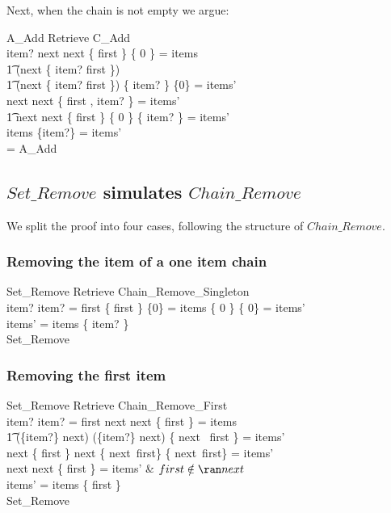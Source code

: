 \documentclass{article}
\begin{document}
Next, when the chain is not empty we argue:

\begin{argue}
	\pre A\_Add \land \Delta Retrieve \land C\_Add \\
\implies item?  \land \dom next \cup \ran next \cup \{ first \} \setminus \{ 0 \} = items \land {} \\
\t1 \dom (next \cup \{ item? \mapsto first \}) \cup {} \\
\t1 \ran (next \cup \{ item? \mapsto first \}) \cup \{ item? \} \setminus \{0\} = items' \\
\implies \dom next \cup \ran next \cup \{ first , item? \} = items' \\
\t1 \implies \dom next \cup \ran next \cup \{ first \} \setminus \{ 0 \} \cup \{ item? \} = items' \\
\implies items \cup \{item?\} = items'\\
= A\_Add
\end{argue}

\subsection{$Set\_Remove$ simulates $Chain\_Remove$}

We split the proof into four cases, following the structure of $Chain\_Remove$.  
\subsubsection{Removing the item of a one item chain}

\begin{argue}
	\pre Set\_Remove \land \Delta Retrieve \land Chain\_Remove\_Singleton \\ 
\implies item?  \land item? = first \land \{ first \} \setminus \{0\} = items \land {} \{ 0 \} \setminus \{ 0\} = items' \\
\implies items' = items \setminus \{ item? \} \\
\implies Set\_Remove
\end{argue}

\subsubsection{Removing the first item}

\begin{argue}
	\pre Set\_Remove \land \Delta Retrieve \land Chain\_Remove\_First \\
\implies item?  \land item? = first \land \dom next \cup \ran next \cup \{ first \} = items \land {} \\
\t1 \dom (\{item?\} \ndres next) \cup \ran (\{item?\} \ndres next) \cup \{ next ~first \} = items' \\
\implies \dom next \setminus \{ first \} \cup \ran next \setminus \{ next~first\} \cup \{ next~first\}  = items' \\
\implies \dom next \cup \ran next \setminus \{ first \} = items' & $first \notin \ran next$ \\
\implies items' = items \setminus \{ first \} \\
\implies Set\_Remove
\end{argue}
\end{document}
